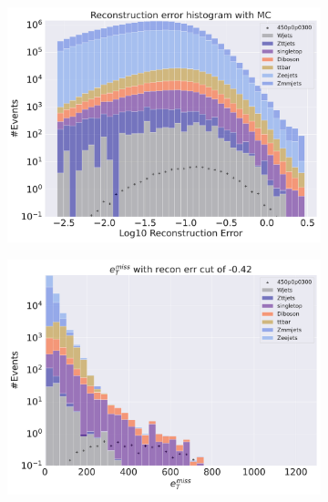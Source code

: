 \begin{figure}[H]
    \centering
    \begin{subfigure}{.40\textwidth}
        \includegraphics[width=\textwidth]{Figures/VAE_testing/small/2lep/b_data_recon_big_rm3_feats_sig_450p0p0300_.pdf}
        \caption{ }
        \label{fig:VAE_2lep_small_450_3}
    \end{subfigure}
    \hfill
    \begin{subfigure}{.40\textwidth}
        \includegraphics[width=\textwidth]{Figures/VAE_testing/small/2lep/b_data_recon_big_rm3_feats_sig_450p0p0300_recon_errcut_-0.42.pdf}
        \caption{}
        \label{fig:VAE_2lep_small_etmiss_450_3}
    \end{subfigure}

\end{figure}

